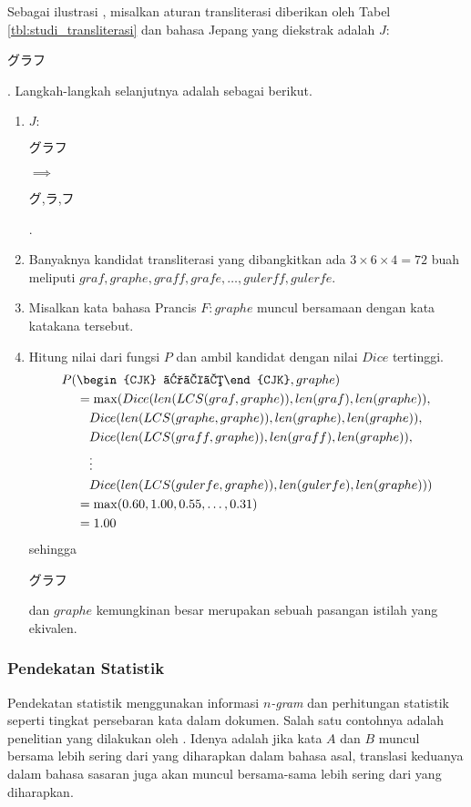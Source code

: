 \documentclass[../main/main.tex]{subfiles}
\begin{document}
Sebagai ilustrasi \parencite{tsuji}, misalkan aturan transliterasi diberikan oleh Tabel \ref{tbl:studi_transliterasi} dan bahasa Jepang yang diekstrak adalah $J:$\begin{CJK}{UTF8}{min}グラフ\end{CJK}. Langkah-langkah selanjutnya adalah sebagai berikut.
\begin{enumerate}
\item $J:$\begin{CJK}{UTF8}{min}グラフ\end{CJK} $\implies$ \begin{CJK}{UTF8}{min}グ,ラ,フ\end{CJK}.
\item Banyaknya kandidat transliterasi yang dibangkitkan ada $3 \times 6 \times 4 = 72$ buah meliputi $graf, graphe, graff, grafe, \ldots, gulerff, gulerfe$.
\item Misalkan kata bahasa Prancis $F:graphe$ muncul bersamaan dengan kata katakana tersebut.
\item Hitung nilai dari fungsi $P$ dan ambil kandidat dengan nilai $Dice$ tertinggi.
\[
	\begin{aligned}
		P(&\text{\begin{CJK}{UTF8}{min}グラフ\end{CJK}},graphe)\\
		&= \max(Dice(len(LCS(graf, graphe)), len(graf), len(graphe)),\\
		&\quad Dice(len(LCS(graphe, graphe)), len(graphe), len(graphe)),\\
		&\quad Dice(len(LCS(graff, graphe)), len(graff), len(graphe)),\\
		&\quad \vdots\\
		&\quad Dice(len(LCS(gulerfe, graphe)), len(gulerfe), len(graphe)))\\
		&= \max(0.60, 1.00, 0.55, \ldots, 0.31)\\
		&= 1.00
	\end{aligned}
\]
sehingga \begin{CJK}{UTF8}{min}グラフ\end{CJK} dan $graphe$ kemungkinan besar merupakan sebuah pasangan istilah yang ekivalen.
\end{enumerate}

\subsubsection{Pendekatan Statistik}
\label{subsubbab:studi_statistik}
Pendekatan statistik menggunakan informasi \textit{$n$-gram} dan perhitungan statistik seperti tingkat persebaran kata dalam dokumen. Salah satu contohnya adalah penelitian yang dilakukan oleh \textcite{rapp}. Idenya adalah jika kata $A$ dan $B$ muncul bersama lebih sering dari yang diharapkan dalam bahasa asal, translasi keduanya dalam bahasa sasaran juga akan muncul bersama-sama lebih sering dari yang diharapkan.
\end{document}
